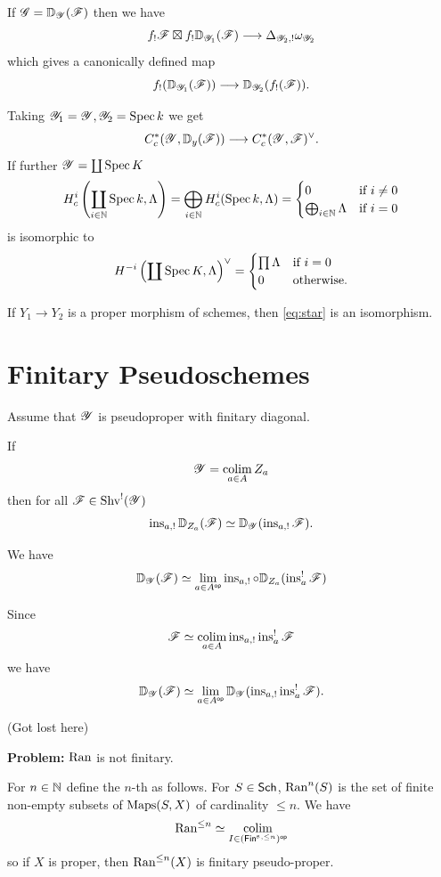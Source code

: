 \documentclass[oneside]{amsart}
\begin{document}
If $\mathscr{G}=\mathbb{D}_{\mathscr{Y}}(\mathscr{F})$ then we have
\[
f_!\CF\boxtimes f_!\VD_{\CY_1}(\CF) \to \Delta_{\CY_2,!}\omega_{\CY_2}
\] 
which gives a canonically defined map
\begin{equation}\label{eq:star}
f_!(\VD_{\CY_1}(\CF)) \to \VD_{\CY_2}(f_!(\CF)).
\end{equation} 

Taking $\mathscr{Y}_1=\mathscr{Y},\mathscr{Y}_2=\operatorname{Spec} k$ we get
\[
C_c^{*}(\CY,\VD_y(\CF)) \to C_c^{*}(\CY,\CF)^{\vee}.
\] 
If further $\mathscr{Y} = \coprod \operatorname{Spec} K$ 
\[
H_c^{i}\left( \coprod_{i \in \mathbb N}\operatorname{Spec} k,\Lambda \right) = \bigoplus_{i\in \mathbb N}H^{i}_c(\operatorname{Spec} k,\Lambda) = \begin{cases}
	0 & \text{if }i\neq 0 \\
	\bigoplus_{i\in \mathbb N}\Lambda & \text{if }i=0
\end{cases}
\] 
is isomorphic to
\[
H^{-i}\left( \coprod \operatorname{Spec} K,\Lambda \right) ^{\vee} = \begin{cases}
	\prod \Lambda & \text{if }i=0 \\
	0 & \text{otherwise}.
\end{cases}
\] 

\begin{lemma}
	If $Y_1\to Y_2$ is a proper morphism of schemes, then \eqref{eq:star} is an isomorphism.
\end{lemma}

\section{Finitary Pseudoschemes}
Assume that $\mathscr{Y}$ is pseudoproper with finitary diagonal.
\begin{proposition}
	If
	\[
	\mathscr{Y} = \operatorname*{colim}_{a\in A}Z_a
	\] 
	then for all $\mathscr{F}\in \operatorname{Shv}^{!}(\mathscr{Y})$ 
	\[
	\operatorname{ins}_{a,!}\mathbb{D}_{Z_a}(\mathscr{F}) \simeq \mathbb{D}_{\mathscr{Y}}(\operatorname{ins}_{a,!}\mathscr{F}).
	\] 
\end{proposition}
\begin{corollary}
	We have
	\[
		\mathbb{D}_{\mathscr{Y}}(\mathscr{F}) \simeq \lim_{a\in A^\mathsf{op}}\operatorname{ins}_{a,!}\circ\mathbb{D}_{Z_a}(\operatorname{ins}_a^{!}\mathscr{F})
	\] 
\end{corollary}
Since
\[
\mathscr{F} \simeq \operatorname*{colim}_{a\in A}\operatorname{ins}_{a,!}\operatorname{ins}_a^{!}\mathscr{F}
\] 
we have
\[
\mathbb{D}_{\mathscr{Y}}(\mathscr{F}) \simeq \lim_{a\in A^\mathsf{op}}\mathbb{D}_{\mathscr{Y}}(\operatorname{ins}_{a,!}\operatorname{ins}_a^{!}\mathscr{F}).
\] 

(Got lost here)

\textbf{Problem:} $\operatorname{Ran}$ is not finitary.

For $n\in \mathbb N$ define the $n$-th  as follows. For $S\in \mathsf{Sch}$, $\operatorname{Ran}^{n}(S)$ is the set of finite non-empty subsets of $\operatorname{Maps}(S,X)$ of cardinality $\le n$. We have
\[
	\Ran^{\le n} \isoto \colim_{I\in (\Fins{^{,\le n}})\op}
\] 
so if $X$ is proper, then $\operatorname{Ran}^{\le n}(X)$ is finitary pseudo-proper.
\end{document}
